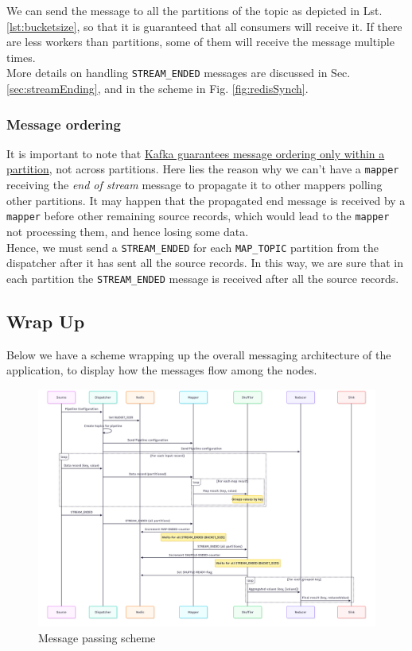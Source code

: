We can send the message to all the partitions of the topic as depicted in Lst. \ref{lst:bucketsize}, so that it is guaranteed that all consumers will receive it. If there are less workers than partitions, some of them will receive the message multiple times.\\
More details on handling \verb|STREAM_ENDED| messages are discussed in Sec. \ref{sec:streamEnding}, and in the scheme in Fig. \ref{fig:redisSynch}.

\subsubsection{Message ordering}
It is important to note that \ul{Kafka guarantees message ordering only within a partition}, not across partitions.
Here lies the reason why we can't have a \texttt{mapper} receiving the \textit{end of stream} message to propagate it to other mappers polling other partitions. It may happen that the propagated end message is received by a \texttt{mapper} before other remaining source records, which would lead to the \texttt{mapper} not processing them, and hence losing some data.\\
Hence, we must send a \verb|STREAM_ENDED| for each \verb|MAP_TOPIC| partition from the dispatcher after it has sent all the source records.
In this way, we are sure that in each partition the \verb|STREAM_ENDED| message is received after all the source records.

\newpage
\subsection{Wrap Up}
Below we have a scheme wrapping up the overall messaging architecture of the application, to display how the messages flow among the nodes.

\begin{figure}[htbp]
   \centering
   \includegraphics[width=\columnwidth]{images/messagePassing.png}
   \caption{Message passing scheme}
   \label{fig:messagePassing}
\end{figure}

